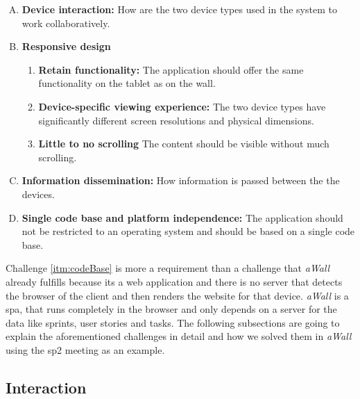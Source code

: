 \documentclass{sigchi}
\begin{document}
\begin{enumerate}[A.]
	\item \textbf{Device interaction:} How are  the two device types used in the system to work collaboratively.~\label{itm:interaction}
	
	\item \textbf{Responsive design}
	\begin{enumerate}[1.]
			\item \textbf{Retain functionality:} The application should offer the same functionality on the tablet as on the wall.~\label{itm:retainFunc}
					
			\item \textbf{Device-specific viewing experience:} The two device types have significantly different screen resolutions and physical dimensions.~\label{itm:rwdViewingExp}
			
			\item \textbf{Little to no scrolling} The content should be visible without much scrolling.~\label{itm:scrolling}
	\end{enumerate}

	\item \textbf{Information dissemination:} How information is passed between the the devices.~\label{itm:information}
	
	\item \textbf{Single code base and platform independence:} The application should not be restricted to an operating system and should be based on a single code base.~\label{itm:codeBase}
\end{enumerate}

Challenge \ref{itm:codeBase} is more a requirement than a challenge that \textit{aWall} already fulfills because its a web application and there is no server that detects the browser of the client and then renders the website for that device.
\textit{aWall} is a \gls{spa}, that runs completely in the browser and only depends on a server for the data like sprints, user stories and tasks.
The following subsections are going to explain the aforementioned challenges in detail and how we solved them in \textit{aWall} using the \gls{sp2} meeting as an example.


\subsection{Interaction}
\end{document}
